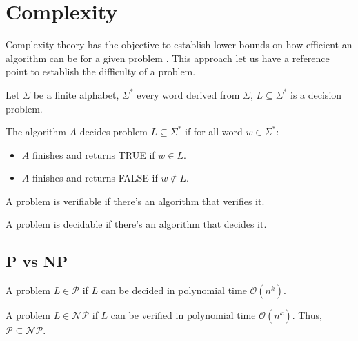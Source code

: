 \section{Complexity}
\label{sec:complex}

Complexity theory has the objective to establish lower bounds on how efficient
an algorithm can be for a given problem \cite{sipser2006}. This approach let us
have a reference point to establish the difficulty of a problem.


\begin{defn}
Let $\Sigma$ be a finite alphabet, $\Sigma^*$ every word derived from $\Sigma$, $L \subseteq \Sigma^*$ is a decision problem.
\end{defn}

\begin{defn}
The algorithm $A$ decides problem $L \subseteq \Sigma^*$ if for all word $w \in \Sigma^*$:
\begin{itemize}
  \item $A$ finishes and returns TRUE if $w \in L$.
  \item $A$ finishes and returns FALSE if $w \notin L$.
\end{itemize}
\end{defn}

\begin{defn}
A problem is verifiable if there's an algorithm that verifies it.
\end{defn}

\begin{defn}
A problem is decidable if there's an algorithm that decides it.
\end{defn}

\subsection{P vs NP}

\begin{defn}
A problem $L \in \mathcal{P}$ if $L$ can be decided in polynomial time $\mathcal{O}(n^k)$.
\end{defn}

\begin{defn}
A problem $L \in \mathcal{NP}$ if $L$ can be verified in polynomial time
$\mathcal{O}(n^k)$. Thus, $\mathcal{P} \subseteq \mathcal{NP}$.
\end{defn}

